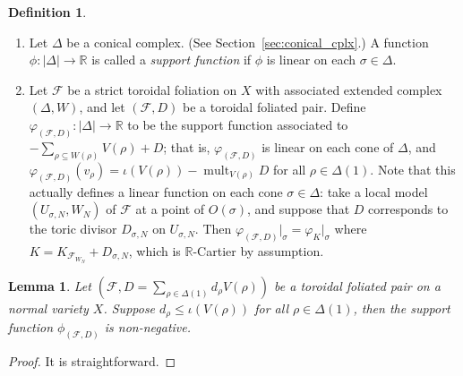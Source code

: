 \documentclass[12pt,reqno]{amsart}
\newtheorem{lemma}[theorem]{Lemma}
\theoremstyle{definition}
\newtheorem{definition}[theorem]{Definition}
\newcommand{\on}{\operatorname}
\newcommand\cF{{\mathcal{F}}}
\newcommand\bR{{\mathbb R}}
\newcommand{\vp}{\varphi}
\begin{document}
\begin{definition}\label{notation1}
\begin{enumerate}
    \item Let $\Delta$ be a conical complex. (See Section~\ref{sec:conical_cplx}.)
    A function $\phi\colon |\Delta| \to \bR$ is called a \emph{support function} if $\phi$ is linear on each $\sigma\in\Delta$. 
    \item Let $\cF$ be a strict toroidal foliation on $X$ with associated extended complex $(\Delta,W)$, and let $(\cF,D)$ be a toroidal foliated pair. 
    Define $\vp_{(\cF,D)}\colon|\Delta|\to\bR$ to be the support function associated to $-\sum_{\rho\subseteq W(\rho)}V(\rho)+D$; that is, $\vp_{(\cF,D)}$ is linear on each cone of $\Delta$, and $\vp_{(\cF,D)}(v_\rho)=\iota(V(\rho))-\on{mult}_{V(\rho)}D$ for all $\rho\in\Delta(1)$. Note that this actually defines a linear function on each cone $\sigma\in\Delta$: take a local model $(U_{\sigma,N},W_N)$ of $\cF$ at a point of $O(\sigma)$, and suppose that $D$ corresponds to the toric divisor $D_{\sigma,N}$ on $U_{\sigma,N}$. Then $\vp_{(\cF,D)}\vert_{\sigma}=\vp_{K}\vert_\sigma$ where $K=K_{\cF_{W_N}}+D_{\sigma,N}$, which is $\bR$-Cartier by assumption. %
\end{enumerate}
\end{definition}


\begin{lemma}\label{non_neg_support_fcn}
    Let $(\cF,D = \sum_{\rho\in\Delta(1)} d_\rho V(\rho))$ be a toroidal foliated pair on a normal variety $X$. 
    Suppose $d_\rho\leq\iota(V(\rho))$ for all $\rho\in\Delta(1)$, then the support function $\phi_{(\cF,D)}$ is non-negative. 
\end{lemma}
\begin{proof}
    It is straightforward. 
\end{proof}
\end{document}
